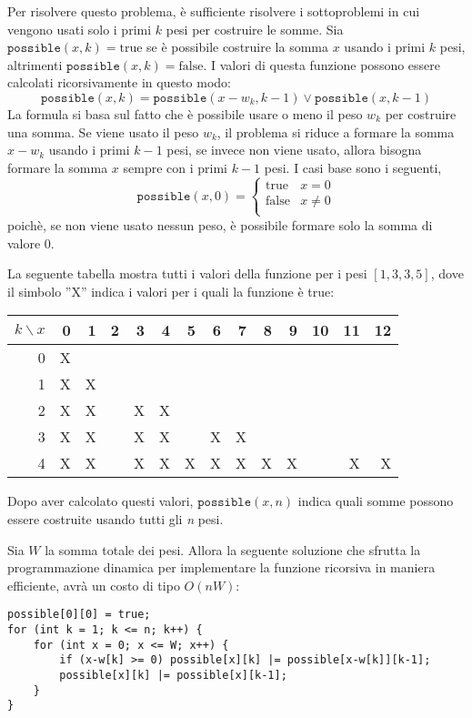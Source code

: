Per risolvere questo problema, è sufficiente
risolvere i sottoproblemi in cui vengono usati solo i primi
$k$ pesi per costruire le somme.
Sia $\texttt{possible}(x,k)=\textrm{true}$ se è
possibile costruire la somma $x$ usando i primi $k$ pesi,
altrimenti $\texttt{possible}(x,k)=\textrm{false}$.
I valori di questa funzione possono essere calcolati 
ricorsivamente in questo modo:
\[ \texttt{possible}(x,k) = \texttt{possible}(x-w_k,k-1) \lor \texttt{possible}(x,k-1) \]
La formula si basa sul fatto che è possibile 
usare o meno il peso $w_k$ per costruire una somma.
Se viene usato il peso $w_k$, il problema si riduce a formare 
la somma $x-w_k$ usando i primi $k-1$ pesi,
se invece non viene usato, allora bisogna formare la somma $x$
sempre con i primi $k-1$ pesi.
I casi base sono i seguenti,
\begin{equation*}
    \texttt{possible}(x,0) = \begin{cases}
               \textrm{true}    & x = 0\\
               \textrm{false}   & x \neq 0 \\
           \end{cases}
\end{equation*}
poichè, se non viene usato nessun peso,
è possibile formare solo la somma di valore 0.

La seguente tabella mostra tutti i valori della funzione
per i pesi $[1,3,3,5]$, dove il simbolo ''X'' indica 
i valori per i quali la funzione è true:

\begin{center}
\begin{tabular}{r|rrrrrrrrrrrrr}
$k \backslash x$ & 0 & 1 & 2 & 3 & 4 & 5 & 6 & 7 & 8 & 9 & 10 & 11 & 12 \\
\hline
 0 & X & \\
 1 & X & X \\
 2 & X & X & & X & X \\
 3 & X & X & & X & X & & X & X \\
 4 & X & X & & X & X & X & X & X & X & X & & X & X \\
\end{tabular}
\end{center}

Dopo aver calcolato questi valori, $\texttt{possible}(x,n)$
indica quali somme possono essere costruite usando tutti gli \emph{n} pesi.

Sia $W$ la somma totale dei pesi.
Allora la seguente soluzione
che sfrutta la programmazione dinamica per
implementare la funzione ricorsiva in maniera
efficiente, avrà un costo di tipo $O(nW)$:
\begin{lstlisting}
possible[0][0] = true;
for (int k = 1; k <= n; k++) {
    for (int x = 0; x <= W; x++) {
        if (x-w[k] >= 0) possible[x][k] |= possible[x-w[k]][k-1];
        possible[x][k] |= possible[x][k-1];
    }
}
\end{lstlisting}

